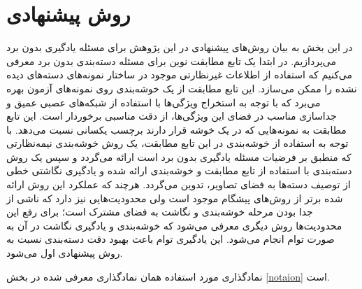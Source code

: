 
\chapter{روش پیشنهادی} \label{chap:proposed}
در این بخش به بیان روش‌های پیشنهادی در این پژوهش برای مسئله یادگیری بدون برد می‌پردازیم. 
در ابتدا یک تابع مطابقت نوین برای مسئله دسته‌بندی بدون برد معرفی می‌کنیم که استفاده از اطلاعات غیرنظارتی موجود در ساختار نمونه‌های دسته‌های دیده نشده را ممکن می‌سازد. این تابع مطابقت از یک خوشه‌بندی روی نمونه‌های آزمون بهره می‌برد که با توجه به استخراج ویژگی‌ها با استفاده از شبکه‌های عصبی عمیق و جداسازی مناسب در فضای این ویژگی‌ها، از دقت مناسبی برخوردار است. این تابع مطابقت به نمونه‌هایی که در یک خوشه قرار دارند برچسب یکسانی نسبت می‌دهد. با توجه به استفاده از خوشه‌بندی در این تابع مطابقت، یک روش خوشه‌بندی نیمه‌نظارتی که منطبق بر فرضیات مسئله یادگیری بدون برد است ارائه می‌گردد و سپس یک روش دسته‌بندی با استفاده از تابع مطابقت و خوشه‌بندی ارائه شده و یادگیری نگاشتی خطی از توصیف دسته‌ها به فضای تصاویر، تدوین می‌گردد. هرچند که عملکرد این روش ارائه شده برتر از روش‌های پیشگام موجود است ولی محدودیت‌هایی نیز دارد که ناشی از جدا بودن مرحله خوشه‌بندی و نگاشت به فضای مشترک است؛ برای رفع این محدودیت‌ها روش دیگری معرفی می‌شود که خوشه‌بندی و یادگیری نگاشت در آن به صورت توام انجام می‌شود. این یادگیری توام باعث بهبود دقت دسته‌بندی نسبت به روش پیشنهادی اول می‌شود.

نمادگذاری مورد استفاده همان نمادگذاری معرفی شده در بخش \ref{notaion} است.
